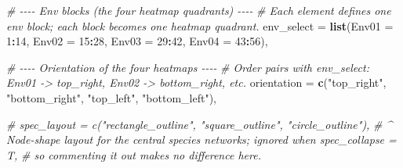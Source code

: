\documentclass[
]{book}
\newenvironment{Shaded}{\begin{snugshade}}{\end{snugshade}}
\newcommand{\AttributeTok}[1]{\textcolor[rgb]{0.13,0.29,0.53}{#1}}
\newcommand{\CommentTok}[1]{\textcolor[rgb]{0.56,0.35,0.01}{\textit{#1}}}
\newcommand{\DecValTok}[1]{\textcolor[rgb]{0.00,0.00,0.81}{#1}}
\newcommand{\FunctionTok}[1]{\textcolor[rgb]{0.13,0.29,0.53}{\textbf{#1}}}
\newcommand{\NormalTok}[1]{#1}
\newcommand{\SpecialCharTok}[1]{\textcolor[rgb]{0.81,0.36,0.00}{\textbf{#1}}}
\newcommand{\StringTok}[1]{\textcolor[rgb]{0.31,0.60,0.02}{#1}}
\begin{document}
\begin{Shaded}
\begin{Highlighting}[]
  \CommentTok{\# {-}{-}{-}{-} Env blocks (the four heatmap quadrants) {-}{-}{-}{-}}
  \CommentTok{\# Each element defines one env block; each block becomes one heatmap quadrant.}
  \AttributeTok{env\_select =} \FunctionTok{list}\NormalTok{(}\AttributeTok{Env01 =} \DecValTok{1}\SpecialCharTok{:}\DecValTok{14}\NormalTok{,}
                    \AttributeTok{Env02 =} \DecValTok{15}\SpecialCharTok{:}\DecValTok{28}\NormalTok{,}
                    \AttributeTok{Env03 =} \DecValTok{29}\SpecialCharTok{:}\DecValTok{42}\NormalTok{,}
                    \AttributeTok{Env04 =} \DecValTok{43}\SpecialCharTok{:}\DecValTok{56}\NormalTok{),}

  \CommentTok{\# {-}{-}{-}{-} Orientation of the four heatmaps {-}{-}{-}{-}}
  \CommentTok{\# Order pairs with env\_select: Env01 {-}\textgreater{} top\_right, Env02 {-}\textgreater{} bottom\_right, etc.}
  \AttributeTok{orientation =} \FunctionTok{c}\NormalTok{(}\StringTok{"top\_right"}\NormalTok{,}
                  \StringTok{"bottom\_right"}\NormalTok{,}
                  \StringTok{"top\_left"}\NormalTok{,}
                  \StringTok{"bottom\_left"}\NormalTok{),}

  \CommentTok{\# spec\_layout = c("rectangle\_outline", "square\_outline", "circle\_outline"),}
  \CommentTok{\# \^{} Node{-}shape layout for the central species networks; ignored when spec\_collapse = T,}
  \CommentTok{\#   so commenting it out makes no difference here.}


\end{Highlighting}
\end{Shaded}
\end{document}
